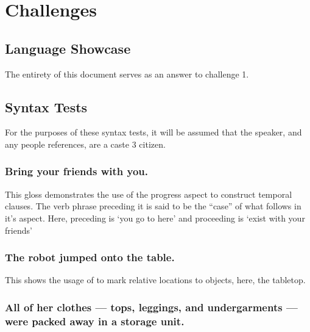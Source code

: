 \chapter{Challenges}


\section{Language Showcase}

The entirety of this document serves as an answer to challenge 1.

\section{Syntax Tests}

For the purposes of these syntax tests, it will be assumed that the speaker, and any people references, are a caste 3 citizen.

\subsection{Bring your friends with you.}


This gloss demonstrates the use of the progress aspect to construct temporal clauses. The verb phrase preceding it is said to be the ``case'' of what follows in it's aspect. Here, preceding is `you go to here' and proceeding is `exist with your friends'



\subsection*{The robot jumped onto the table.}




This shows the usage of  to mark relative locations to objects, here, the tabletop.

\subsection*{All of her clothes --- tops, leggings, and undergarments --- were packed away in a storage unit.}

